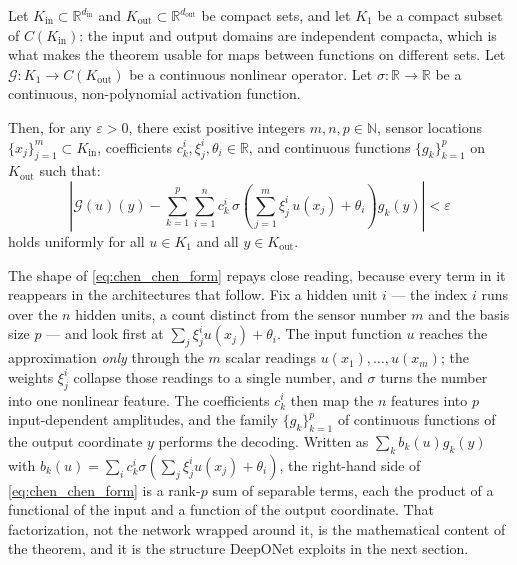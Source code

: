\begin{theorem}
\label{thm:chen_chen}
Let $K_{\mathrm{in}} \subset \mathbb{R}^{d_{\mathrm{in}}}$ and $K_{\mathrm{out}} \subset \mathbb{R}^{d_{\mathrm{out}}}$ be compact sets, and let $K_1$ be a compact subset of $C(K_{\mathrm{in}})$: the input and output domains are independent compacta, which is what makes the theorem usable for maps between functions on different sets. Let $\mathcal{G} : K_1 \to C(K_{\mathrm{out}})$ be a continuous nonlinear operator. Let $\sigma : \mathbb{R} \to \mathbb{R}$ be a continuous, non-polynomial activation function.

Then, for any $\varepsilon > 0$, there exist positive integers $m, n, p \in \mathbb{N}$, sensor locations $\{x_j\}_{j=1}^m \subset K_{\mathrm{in}}$, coefficients $c_k^i, \xi_{j}^i, \theta_i \in \mathbb{R}$, and continuous functions $\{g_k\}_{k=1}^p$ on $K_{\mathrm{out}}$ such that:
\begin{equation}
  \label{eq:chen_chen_form}
  \left| \mathcal{G}(u)(y) - \sum_{k=1}^p \sum_{i=1}^n c_k^i \, \sigma\left( \sum_{j=1}^m \xi_j^i \, u(x_j) + \theta_i \right) g_k(y) \right| < \varepsilon
\end{equation}
holds uniformly for all $u \in K_1$ and all $y \in K_{\mathrm{out}}$.
\end{theorem}

The shape of \eqref{eq:chen_chen_form} repays close reading, because every term in it reappears in the architectures that follow. Fix a hidden unit $i$ --- the index $i$ runs over the $n$ hidden units, a count distinct from the sensor number $m$ and the basis size $p$ --- and look first at $\sum_{j}\xi_{j}^{i}u(x_{j})+\theta_{i}$. The input function $u$ reaches the approximation \emph{only} through the $m$ scalar readings $u(x_{1}),\dots,u(x_{m})$; the weights $\xi_{j}^{i}$ collapse those readings to a single number, and $\sigma$ turns the number into one nonlinear feature. The coefficients $c_{k}^{i}$ then map the $n$ features into $p$ input-dependent amplitudes, and the family $\{g_{k}\}_{k=1}^{p}$ of continuous functions of the output coordinate $y$ performs the decoding. Written as $\sum_{k}b_{k}(u)g_{k}(y)$ with $b_{k}(u)=\sum_{i}c_{k}^{i}\sigma(\sum_{j}\xi_{j}^{i}u(x_{j})+\theta_{i})$, the right-hand side of \eqref{eq:chen_chen_form} is a rank-$p$ sum of separable terms, each the product of a functional of the input and a function of the output coordinate. That factorization, not the network wrapped around it, is the mathematical content of the theorem, and it is the structure DeepONet exploits in the next section.

